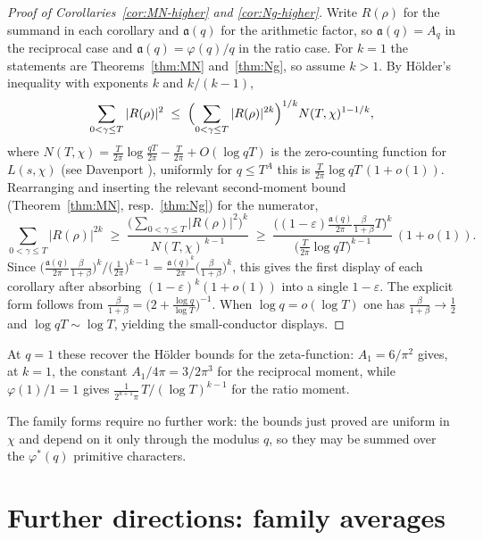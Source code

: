 \documentclass[12pt,a4paper,reqno]{amsart}
\theoremstyle{remark}
\numberwithin{equation}{section}
\begin{document}
\begin{proof}[Proof of Corollaries~\textup{\ref{cor:MN-higher}} and \textup{\ref{cor:Ng-higher}}]
Write $R(\rho)$ for the summand in each corollary and $\mathfrak a(q)$ for the arithmetic factor, so $\mathfrak a(q)=A_q$ in the reciprocal case and $\mathfrak a(q)=\varphi(q)/q$ in the ratio case. For $k=1$ the statements are Theorems~\ref{thm:MN} and~\ref{thm:Ng}, so assume $k>1$. By H\"older's inequality with exponents $k$ and $k/(k-1)$,
\[
  \sum_{0<\gamma\le T}|R(\rho)|^{2}
  \;\le\;\Bigl(\sum_{0<\gamma\le T}|R(\rho)|^{2k}\Bigr)^{1/k}N(T,\chi)^{1-1/k},
\]
where $N(T,\chi)=\frac{T}{2\pi}\log\frac{qT}{2\pi}-\frac{T}{2\pi}+O(\log qT)$ is
the zero-counting function for $L(s,\chi)$ (see Davenport \cite[Ch.~16]{Davenport}), uniformly for $q\le T^{A}$ this is $\frac{T}{2\pi}\log qT\,(1+o(1))$. Rearranging and inserting the relevant second-moment bound (Theorem~\ref{thm:MN}, resp.~\ref{thm:Ng}) for
the numerator,
\[
  \sum_{0<\gamma\le T}|R(\rho)|^{2k}
  \;\ge\;\frac{\bigl(\sum_{0<\gamma\le T}|R(\rho)|^{2}\bigr)^{k}}{N(T,\chi)^{\,k-1}}
  \;\ge\;\frac{\bigl((1-\varepsilon)\tfrac{\mathfrak a(q)}{2\pi}\tfrac{\beta}{1+\beta}T\bigr)^{k}}
            {\bigl(\tfrac{T}{2\pi}\log qT\bigr)^{k-1}}\,(1+o(1)).
\]
Since $\bigl(\tfrac{\mathfrak a(q)}{2\pi}\tfrac{\beta}{1+\beta}\bigr)^{k}\big/
\bigl(\tfrac1{2\pi}\bigr)^{k-1}
=\tfrac{\mathfrak a(q)^{k}}{2\pi}\bigl(\tfrac{\beta}{1+\beta}\bigr)^{k}$, this gives the first display of each corollary after absorbing $(1-\varepsilon)^{k}(1+o(1))$ into a single $1-\varepsilon$. The explicit form follows from $\tfrac{\beta}{1+\beta}=\bigl(2+\tfrac{\log q}{\log T}\bigr)^{-1}$. When $\log q=o(\log T)$ one has $\tfrac{\beta}{1+\beta}\to\tfrac12$ and $\log qT\sim\log T$, yielding the small-conductor displays.
\end{proof}

At $q=1$ these recover the H\"older bounds for the zeta-function:
$A_1=6/\pi^2$ gives, at $k=1$, the constant $A_1/4\pi=3/2\pi^3$ for the reciprocal moment, while $\varphi(1)/1=1$ gives $\tfrac{1}{2^{k+1}\pi}\,T/(\log T)^{k-1}$ for the ratio
moment.

The family forms require no further work: the bounds just proved are uniform in $\chi$ and depend on it only through the modulus $q$, so they may be summed over the $\varphi^{*}(q)$ primitive characters.

\section{Further directions: family averages}\label{sect:family}
\end{document}
